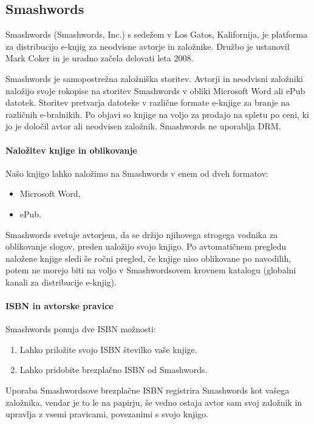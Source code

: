 \documentclass[a4paper, 12pt]{book}
\begin{document}
\subsection{Smashwords}
Smashwords (Smashwords, Inc.) s sedežem v Los Gatos, Kalifornija, je platforma za distribucijo e-knjig za neodvisne avtorje in založnike. Družbo je ustanovil Mark Coker in je uradno začela delovati leta 2008. \cite{46}

Smashwords je samopostrežna založniška storitev. Avtorji in neodvisni založniki naložijo svoje rokopise na storitev Smashwords v obliki Microsoft Word ali ePub datotek. Storitev pretvarja datoteke v različne formate e-knjige za branje na različnih e-bralnikih. Po objavi so knjige na voljo za prodajo na spletu po ceni, ki jo je določil avtor ali neodvisen založnik. Smashwords ne uporablja DRM.

\paragraph{Naložitev knjige in oblikovanje}
Našo knjigo lahko naložimo na Smashwords v enem od dveh formatov:
\begin{itemize}
	\item Microsoft Word,
	\item ePub.
\end{itemize}

Smashwords svetuje avtorjem, da se držijo njihovega strogega vodnika za oblikovanje slogov, preden naložijo svojo knjigo. Po avtomatičnem pregledu naložene knjige sledi še ročni pregled, če knjige niso oblikovane po navodilih, potem ne morejo biti na voljo v Smashwordsovem krovnem katalogu (globalni kanali za distribucije e-knjig).

\paragraph{ISBN in avtorske pravice}
Smashwords ponuja dve ISBN možnosti:
\begin{enumerate}
	\item Lahko priložite svojo ISBN številko vaše knjige.
	\item Lahko pridobite brezplačno ISBN od Smashwords.
\end{enumerate}

Uporaba Smashwordsove brezplačne ISBN registrira Smashwords kot vašega založnika, vendar je to le na papirju, še vedno ostaja avtor sam svoj založnik in upravlja z vsemi pravicami, povezanimi s svojo knjigo.
\end{document}

